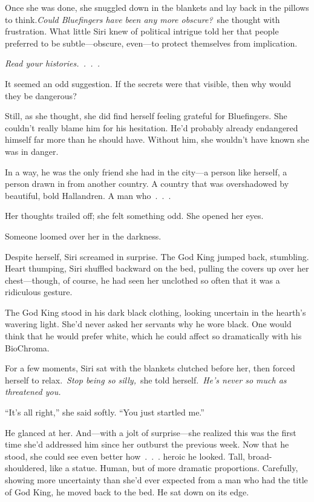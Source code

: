 Once she was done, she snuggled down in the blankets and lay back in the pillows to think.\textit{Could Bluefingers have been any more obscure?}~she thought with frustration. What little Siri knew of political intrigue told her that people preferred to be subtle—obscure, even—to protect themselves from implication.

\textit{Read your histories.~.~.~.}

It seemed an odd suggestion. If the secrets were that visible, then why would they be dangerous?

Still, as she thought, she did find herself feeling grateful for Bluefingers. She couldn’t really blame him for his hesitation. He’d probably already endangered himself far more than he should have. Without him, she wouldn’t have known she was in danger.

In a way, he was the only friend she had in the city—a person like herself, a person drawn in from another country. A country that was overshadowed by beautiful, bold Hallandren. A man who~.~.~.

Her thoughts trailed off; she felt something odd. She opened her eyes.

Someone loomed over her in the darkness.

Despite herself, Siri screamed in surprise. The God King jumped back, stumbling. Heart thumping, Siri shuffled backward on the bed, pulling the covers up over her chest—though, of course, he had seen her unclothed so often that it was a ridiculous gesture.

The God King stood in his dark black clothing, looking uncertain in the hearth’s wavering light. She’d never asked her servants why he wore black. One would think that he would prefer white, which he could affect so dramatically with his BioChroma.

For a few moments, Siri sat with the blankets clutched before her, then forced herself to relax.~\textit{Stop being so silly,}~she told herself.~\textit{He’s never so much as threatened you.}

“It’s all right,” she said softly. “You just startled me.”

He glanced at her. And—with a jolt of surprise—she realized this was the first time she’d addressed him since her outburst the previous week. Now that he stood, she could see even better how~.~.~. heroic he looked. Tall, broad-shouldered, like a statue. Human, but of more dramatic proportions. Carefully, showing more uncertainty than she’d ever expected from a man who had the title of God King, he moved back to the bed. He sat down on its edge.

